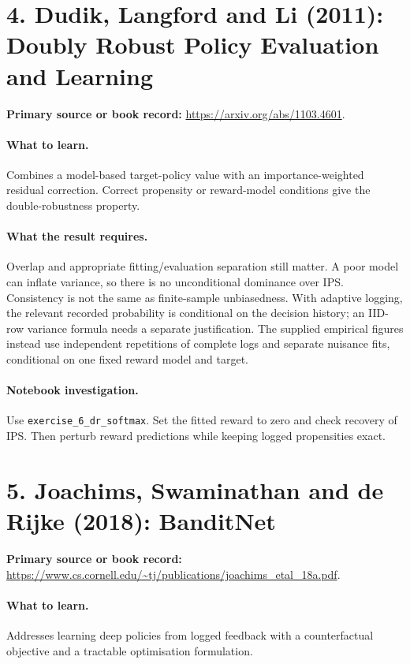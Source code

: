 \documentclass[11pt]{scrartcl}
\begin{document}
\section*{4. Dudik, Langford and Li (2011): Doubly Robust Policy Evaluation and Learning}
\textbf{Primary source or book record:} \url{https://arxiv.org/abs/1103.4601}.

\paragraph{What to learn.} Combines a model-based target-policy value with an importance-weighted residual correction. Correct propensity or reward-model conditions give the double-robustness property.

\paragraph{What the result requires.} Overlap and appropriate fitting/evaluation separation still matter. A poor model can inflate variance, so there is no unconditional dominance over IPS. Consistency is not the same as finite-sample unbiasedness. With adaptive logging, the relevant recorded probability is conditional on the decision history; an IID-row variance formula needs a separate justification. The supplied empirical figures instead use independent repetitions of complete logs and separate nuisance fits, conditional on one fixed reward model and target.

\paragraph{Notebook investigation.} Use \texttt{exercise\_6\_dr\_softmax}. Set the fitted reward to zero and check recovery of IPS. Then perturb reward predictions while keeping logged propensities exact.

\section*{5. Joachims, Swaminathan and de Rijke (2018): BanditNet}
\textbf{Primary source or book record:} \url{https://www.cs.cornell.edu/~tj/publications/joachims_etal_18a.pdf}.

\paragraph{What to learn.} Addresses learning deep policies from logged feedback with a counterfactual objective and a tractable optimisation formulation.
\end{document}

